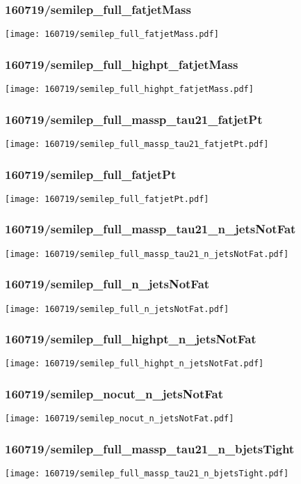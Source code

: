 \begin{frame}
   \frametitle{\small 160719/semilep\_full\_fatjetMass}
   \centering
   \texttt{[image: 160719/semilep\_full\_fatjetMass.pdf]}
\end{frame}

\begin{frame}
   \frametitle{\small 160719/semilep\_full\_highpt\_fatjetMass}
   \centering
   \texttt{[image: 160719/semilep\_full\_highpt\_fatjetMass.pdf]}
\end{frame}

\begin{frame}
   \frametitle{\small 160719/semilep\_full\_massp\_tau21\_fatjetPt}
   \centering
   \texttt{[image: 160719/semilep\_full\_massp\_tau21\_fatjetPt.pdf]}
\end{frame}

\begin{frame}
   \frametitle{\small 160719/semilep\_full\_fatjetPt}
   \centering
   \texttt{[image: 160719/semilep\_full\_fatjetPt.pdf]}
\end{frame}

\begin{frame}
   \frametitle{\small 160719/semilep\_full\_massp\_tau21\_n\_jetsNotFat}
   \centering
   \texttt{[image: 160719/semilep\_full\_massp\_tau21\_n\_jetsNotFat.pdf]}
\end{frame}

\begin{frame}
   \frametitle{\small 160719/semilep\_full\_n\_jetsNotFat}
   \centering
   \texttt{[image: 160719/semilep\_full\_n\_jetsNotFat.pdf]}
\end{frame}

\begin{frame}
   \frametitle{\small 160719/semilep\_full\_highpt\_n\_jetsNotFat}
   \centering
   \texttt{[image: 160719/semilep\_full\_highpt\_n\_jetsNotFat.pdf]}
\end{frame}

\begin{frame}
   \frametitle{\small 160719/semilep\_nocut\_n\_jetsNotFat}
   \centering
   \texttt{[image: 160719/semilep\_nocut\_n\_jetsNotFat.pdf]}
\end{frame}

\begin{frame}
   \frametitle{\small 160719/semilep\_full\_massp\_tau21\_n\_bjetsTight}
   \centering
   \texttt{[image: 160719/semilep\_full\_massp\_tau21\_n\_bjetsTight.pdf]}
\end{frame}

